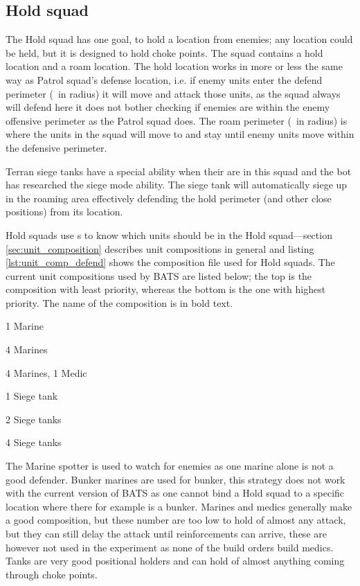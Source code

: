 \subsection{Hold squad}
\label{sec:hold_squad}
The Hold squad has one goal, to hold a location from enemies; any location could be held, but it is designed to hold choke points. The squad contains a hold location and a roam location. The hold location works in more or less the same way as Patrol squad's defense location, i.e. if enemy units enter the defend perimeter (\squadDefendDefendPerimeter~in radius) it will move and attack those units, as the squad always will defend here it does not bother checking if enemies are within the enemy offensive perimeter as the Patrol squad does. The roam perimeter (\squadDefendRoamPerimeter~in radius) is where the units in the squad will move to and stay until enemy units move within the defensive perimeter.

Terran siege tanks have a special ability when their are in this squad and the bot has researched the siege mode ability. The siege tank will automatically siege up in the roaming area effectively defending the hold perimeter (and other close positions) from its location.

Hold squads use s to know which units should be in the Hold squad—section \ref{sec:unit_composition} describes unit compositions in general and listing \ref{lst:unit_comp_defend} shows the composition file used for Hold squads. The current unit compositions used by BATS are listed below; the top is the composition with least priority, whereas the bottom is the one with highest priority. The name of the composition is in bold text.

\begin{function_description}
	\item[Marine spotter] 1 Marine
	\item[Bunker Marines] 4 Marines
	\item[Marine Medics] 4 Marines, 1 Medic
	\item[Tanks 1] 1 Siege tank
	\item[Tanks 2] 2 Siege tanks
	\item[Tanks 4] 4 Siege tanks
\end{function_description}
The Marine spotter is used to watch for enemies as one marine alone is not a good defender. Bunker marines are used for bunker, this strategy does not work with the current version of BATS as one cannot bind a Hold squad to a specific location where there for example is a bunker. Marines and medics generally make a good composition, but these number are too low to hold of almost any attack, but they can still delay the attack until reinforcements can arrive, these are however not used in the experiment as none of the build orders build medics. Tanks are very good positional holders and can hold of almost anything coming through choke points\cite{day9}.

